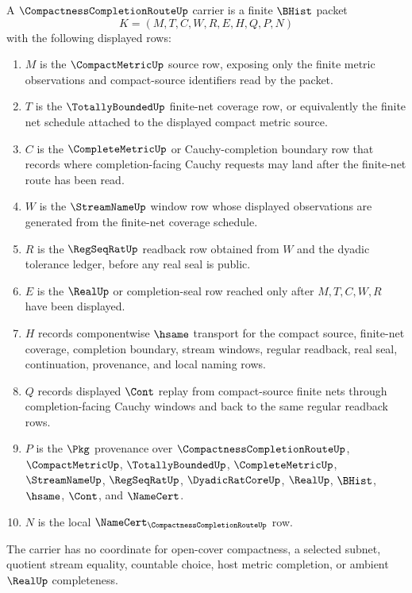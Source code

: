 \begin{definition}
\label{def:compactness-completion-route-carrier}
A $\CompactnessCompletionRouteUp$ carrier is a finite $\BHist$ packet
$$
K=(M,T,C,W,R,E,H,Q,P,N)
$$
with the following displayed rows:
\begin{enumerate}
\item $M$ is the $\CompactMetricUp$ source row, exposing only the finite metric observations and compact-source identifiers read by the packet.
\item $T$ is the $\TotallyBoundedUp$ finite-net coverage row, or equivalently the finite net schedule attached to the displayed compact metric source.
\item $C$ is the $\CompleteMetricUp$ or Cauchy-completion boundary row that records where completion-facing Cauchy requests may land after the finite-net route has been read.
\item $W$ is the $\StreamNameUp$ window row whose displayed observations are generated from the finite-net coverage schedule.
\item $R$ is the $\RegSeqRatUp$ readback row obtained from $W$ and the dyadic tolerance ledger, before any real seal is public.
\item $E$ is the $\RealUp$ or completion-seal row reached only after $M,T,C,W,R$ have been displayed.
\item $H$ records componentwise $\hsame$ transport for the compact source, finite-net coverage, completion boundary, stream windows, regular readback, real seal, continuation, provenance, and local naming rows.
\item $Q$ records displayed $\Cont$ replay from compact-source finite nets through completion-facing Cauchy windows and back to the same regular readback rows.
\item $P$ is the $\Pkg$ provenance over $\CompactnessCompletionRouteUp$, $\CompactMetricUp$, $\TotallyBoundedUp$, $\CompleteMetricUp$, $\StreamNameUp$, $\RegSeqRatUp$, $\DyadicRatCoreUp$, $\RealUp$, $\BHist$, $\hsame$, $\Cont$, and $\NameCert$.
\item $N$ is the local $\NameCert_{\CompactnessCompletionRouteUp}$ row.
\end{enumerate}
The carrier has no coordinate for open-cover compactness, a selected subnet, quotient stream equality, countable choice, host metric completion, or ambient $\RealUp$ completeness.
\end{definition}

